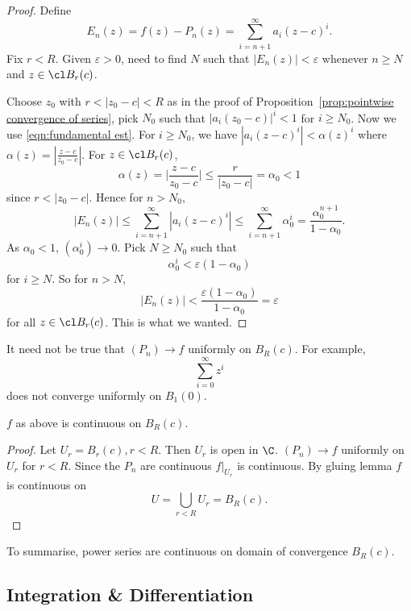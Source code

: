 \documentclass[a4paper]{article}
\theoremstyle{definition}
\begin{document}
\begin{proof}
  Define
  \[
    E_n(z) = f(z) - P_n(z) = \sum_{i=n+1}^{\infty}a_i(z-c)^i. 
  \]
  Fix \(r< R\). Given \(\varepsilon>0\), need to find \(N \) such that \(|E_n(z)| < \varepsilon\) whenever \(n\geq N\) and \(z\in \cl B_r(c)\).

  Choose \(z_0\) with \(r< |z_0-c| < R\) as in the proof of Proposition~\ref{prop:pointwise convergence of series}, pick \(N_0\) such that \(|a_i(z_0-c)|^i<1\) for \(i\geq N_0\). Now we use \ref{eqn:fundamental est}. For \(i\geq N_0\), we have \(|a_i(z-c)^i| < \alpha(z)^i\) where \(\alpha(z) = |\frac{z-c}{z_0-c}|\). For \(z\in \cl B_r(c)\),
  \[
    \alpha(z) = \Big| \frac{z-c}{z_0-c} \Big| \leq \frac{r}{|z_0-c|} = \alpha_0 < 1
  \]
  since \(r < |z_0-c|\). Hence for \(n>N_0\),
  \[
    |E_n(z)| \leq \sum_{i=n+1}^{\infty}|a_i(z-c)^i| \leq \sum_{i=n+1}^{\infty}\alpha_0^i = \frac{\alpha_0^{n+1}}{1-\alpha_0}.
  \]
  As \(\alpha_0 < 1\), \((\alpha_0^i)\to 0\). Pick \(N\geq N_0\) such that
  \[
\alpha_0^i < \varepsilon (1-\alpha_0)
  \]
  for \(i\geq N\). So for \(n>N\),
  \[
    |E_n(z)| < \frac{\varepsilon (1-\alpha_0)}{1-\alpha_0} = \varepsilon
  \]
  for all \(z\in \cl B_r(c)\).
  This is what we wanted.
\end{proof}

\begin{note}
  It need not be true that \((P_n)\to f\) uniformly on \(B_R(c)\). For example,
  \[
    \sum_{i=0}^{\infty}z^i
  \]
  does not converge uniformly on \(B_1(0)\).
\end{note}

\begin{corollary}
  \(f\) as above is continuous on \(B_R(c)\).
\end{corollary}

\begin{proof}
  Let \(U_r = B_r(c), r<R\). Then \(U_r\) is open in \(\C\). \((P_n)\to f\) uniformly on \(U_r\) for \(r< R\). Since the \(P_n\) are continuous \(f|_{U_r}\) is continuous. By gluing lemma \(f\) is continuous on
  \[
    U = \bigcup_{r<R} U_r = B_R(c).
  \]
\end{proof}

To summarise, power series are continuous on domain of convergence \(B_R(c)\).

\subsection{Integration \& Differentiation}
\end{document}
